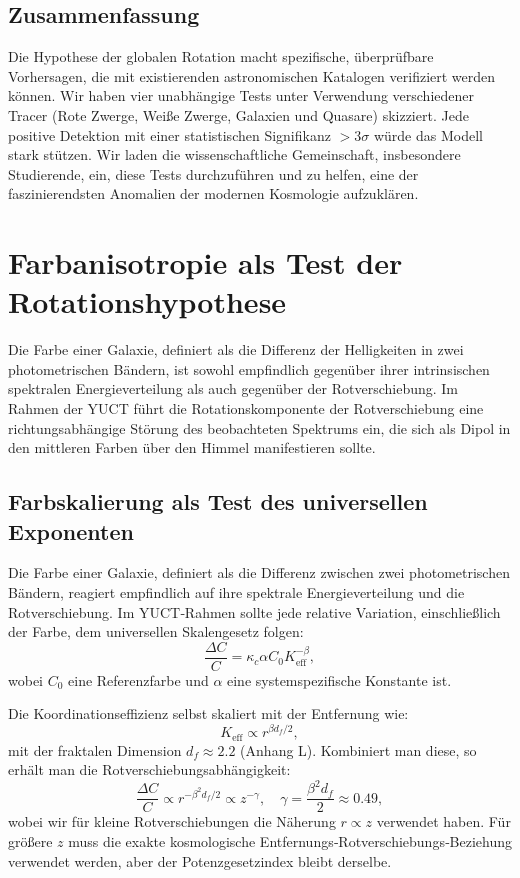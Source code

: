\documentclass[11pt,a4paper]{article}
\begin{document}
	\subsection{Zusammenfassung}
	
	Die Hypothese der globalen Rotation macht spezifische, überprüfbare Vorhersagen, die mit existierenden astronomischen Katalogen verifiziert werden können. Wir haben vier unabhängige Tests unter Verwendung verschiedener Tracer (Rote Zwerge, Weiße Zwerge, Galaxien und Quasare) skizziert. Jede positive Detektion mit einer statistischen Signifikanz \(>3\sigma\) würde das Modell stark stützen. Wir laden die wissenschaftliche Gemeinschaft, insbesondere Studierende, ein, diese Tests durchzuführen und zu helfen, eine der faszinierendsten Anomalien der modernen Kosmologie aufzuklären.
	
	\section{Farbanisotropie als Test der Rotationshypothese}
	
	Die Farbe einer Galaxie, definiert als die Differenz der Helligkeiten in zwei photometrischen Bändern, ist sowohl empfindlich gegenüber ihrer intrinsischen spektralen Energieverteilung als auch gegenüber der Rotverschiebung. Im Rahmen der YUCT führt die Rotationskomponente der Rotverschiebung eine richtungsabhängige Störung des beobachteten Spektrums ein, die sich als Dipol in den mittleren Farben über den Himmel manifestieren sollte.
	
	\subsection{Farbskalierung als Test des universellen Exponenten}
	
	Die Farbe einer Galaxie, definiert als die Differenz zwischen zwei photometrischen Bändern, reagiert empfindlich auf ihre spektrale Energieverteilung und die Rotverschiebung. Im YUCT‑Rahmen sollte jede relative Variation, einschließlich der Farbe, dem universellen Skalengesetz folgen:
	\begin{equation}
		\frac{\Delta C}{C} = \kappa_c \alpha C_0 K_{\mathrm{eff}}^{-\beta},
	\end{equation}
	wobei \(C_0\) eine Referenzfarbe und \(\alpha\) eine systemspezifische Konstante ist.
	
	Die Koordinationseffizienz selbst skaliert mit der Entfernung wie:
	\begin{equation}
		K_{\mathrm{eff}} \propto r^{\beta d_f / 2},
	\end{equation}
	mit der fraktalen Dimension \(d_f \approx 2.2\) (Anhang L). Kombiniert man diese, so erhält man die Rotverschiebungsabhängigkeit:
	\begin{equation}
		\frac{\Delta C}{C} \propto r^{-\beta^2 d_f / 2} \propto z^{-\gamma}, \quad \gamma = \frac{\beta^2 d_f}{2} \approx 0.49,
	\end{equation}
	wobei wir für kleine Rotverschiebungen die Näherung \(r \propto z\) verwendet haben. Für größere \(z\) muss die exakte kosmologische Entfernungs‑Rotverschiebungs‑Beziehung verwendet werden, aber der Potenzgesetzindex bleibt derselbe.
	
\end{document}
